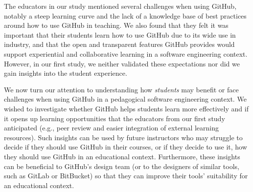 The educators in our study mentioned several challenges when using GitHub, notably a steep learning curve and the lack of a knowledge base of best practices around how to use GitHub in teaching. We also found that they felt it was important that their students learn how to use GitHub due to its wide use in industry, and that the open and transparent features GitHub provides would support experiential and collaborative learning in a software engineering context. However, in our first study, we neither validated these expectations nor did we gain insights into the student experience.

We now turn our attention to understanding how \emph{students} may benefit or face challenges when using GitHub in a pedagogical software engineering context. We wished to investigate whether GitHub helps students learn more effectively and if it opens up learning opportunities that the educators from our first study anticipated (e.g., peer review and easier integration of external learning resources). Such insights can be used by future instructors who may struggle to decide if they should use GitHub in their courses, or if they decide to use it, how they should use GitHub in an educational context. Furthermore, these insights can be beneficial to GitHub's design team (or to the designers of similar tools, such as GitLab or BitBucket) so that they can improve their tools' suitability for an educational context.




